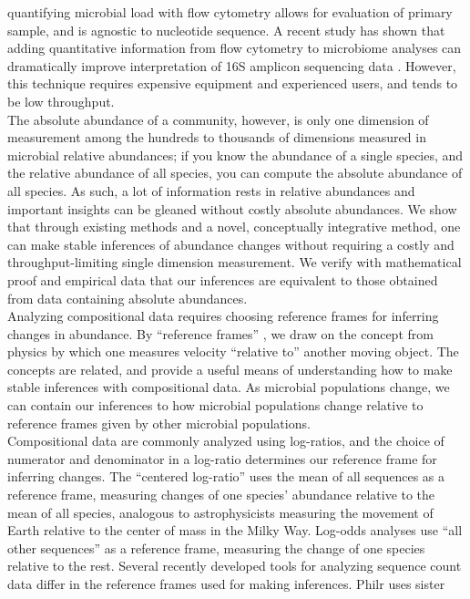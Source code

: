 quantifying microbial load with flow cytometry allows for evaluation of primary sample, and is agnostic
to nucleotide sequence. A recent study has shown that adding quantitative information from flow cytometry
to microbiome analyses can dramatically improve interpretation of 16S amplicon sequencing data
\cite{Vandeputte2017-jl}. However, this technique requires expensive equipment and experienced users,
and tends to be low throughput. \\[5 mm]
%
The absolute abundance of a community, however, is only one dimension of measurement among the hundreds
to thousands of dimensions measured in microbial relative abundances; if you know the abundance of a
single species, and the relative abundance of all species, you can compute the absolute abundance of
all species. As such, a lot of information rests in relative abundances and important insights can be
gleaned without costly absolute abundances. We show that through existing methods and a novel,
conceptually integrative method, one can make stable inferences of abundance changes without requiring
a costly and throughput-limiting single dimension measurement. We verify with mathematical proof and
empirical data that our inferences are equivalent to those obtained from data containing absolute abundances.\\[5 mm]
%
Analyzing compositional data requires choosing reference frames for inferring changes in abundance.
By “reference frames” , we draw on the concept from physics by which one measures velocity “relative to”
another moving object. The concepts are related, and provide a useful means of understanding how to make
stable inferences with compositional data. As microbial populations change, we can contain our inferences
to how microbial populations change relative to reference frames given by other microbial populations.\\[5 mm]
%
Compositional data are commonly analyzed using log-ratios, and the choice of numerator and denominator
in a log-ratio determines our reference frame for inferring changes. The “centered log-ratio” uses the
mean of all sequences as a reference frame, measuring changes of one species' abundance relative to the
mean of all species, analogous to astrophysicists measuring the movement of Earth relative to the center
of mass in the Milky Way. Log-odds analyses use “all other sequences” as a reference frame, measuring the
change of one species relative to the rest. Several recently developed tools for analyzing sequence count
data differ in the reference frames used for making inferences. Ph\gls{ilr} \cite{Silverman2016-he} uses sister
